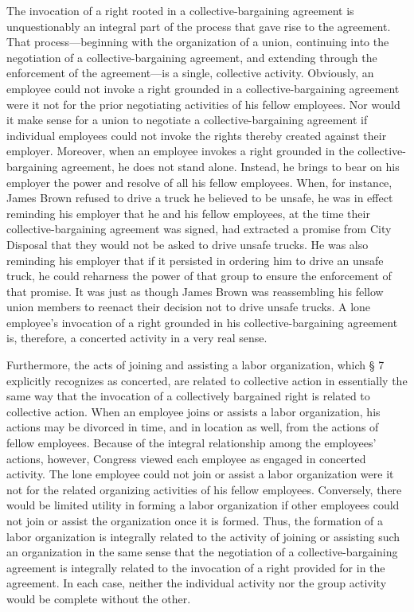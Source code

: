 \documentclass[
  letterpaper,
  11pt,
  DIV=9,
  openright]{scrbook}
\begin{document}
The invocation of a right rooted in a collective-bargaining agreement is
unquestionably an integral part of the process that gave rise to the
agreement. That process---beginning with the organization of a union,
continuing into the negotiation of a collective-bargaining agreement,
and extending through the enforcement of the agreement---is a single,
collective activity. Obviously, an employee could not invoke a right
grounded in a collective-bargaining agreement were it not for the prior
negotiating activities of his fellow employees. Nor would it make sense
for a union to negotiate a collective-bargaining agreement if individual
employees could not invoke the rights thereby created against their
employer. Moreover, when an employee invokes a right grounded in the
collective-bargaining agreement, he does not stand alone. Instead, he
brings to bear on his employer the power and resolve of all his fellow
employees. When, for instance, James Brown refused to drive a truck he
believed to be unsafe, he was in effect reminding his employer that he
and his fellow employees, at the time their collective-bargaining
agreement was signed, had extracted a promise from City Disposal that
they would not be asked to drive unsafe trucks. He was also reminding
his employer that if it persisted in ordering him to drive an unsafe
truck, he could reharness the power of that group to ensure the
enforcement of that promise. It was just as though James Brown was
reassembling his fellow union members to reenact their decision not to
drive unsafe trucks. A lone employee's invocation of a right grounded in
his collective-bargaining agreement is, therefore, a concerted activity
in a very real sense.

Furthermore, the acts of joining and assisting a labor organization,
which § 7 explicitly recognizes as concerted, are related to collective
action in essentially the same way that the invocation of a collectively
bargained right is related to collective action. When an employee joins
or assists a labor organization, his actions may be divorced in time,
and in location as well, from the actions of fellow employees. Because
of the integral relationship among the employees' actions, however,
Congress viewed each employee as engaged in concerted activity. The lone
employee could not join or assist a labor organization were it not for
the related organizing activities of his fellow employees. Conversely,
there would be limited utility in forming a labor organization if other
employees could not join or assist the organization once it is formed.
Thus, the formation of a labor organization is integrally related to the
activity of joining or assisting such an organization in the same sense
that the negotiation of a collective-bargaining agreement is integrally
related to the invocation of a right provided for in the agreement. In
each case, neither the individual activity nor the group activity would
be complete without the other.
\end{document}
